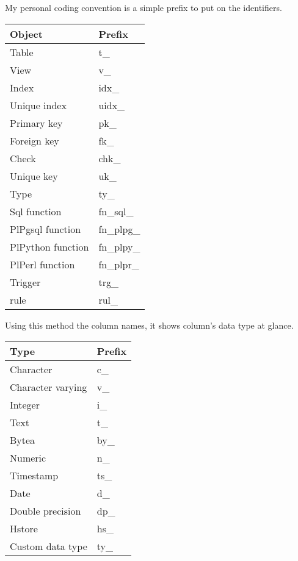 My personal coding convention is a simple prefix to put on the identifiers.
\begin{table}[H]
\begin{tabular}{ll}
 \textbf{Object} & \textbf{Prefix}  \\
 \hline
 Table & t\_ \\
 View & v\_ \\
Index & idx\_ \\
Unique index & uidx\_ \\
Primary key & pk\_ \\
Foreign key & fk\_ \\
Check & chk\_ \\
Unique key & uk\_ \\
Type & ty\_ \\
Sql function & fn\_sql\_ \\
PlPgsql function & fn\_plpg\_ \\
PlPython function & fn\_plpy\_ \\
PlPerl function & fn\_plpr\_ \\
Trigger & trg\_ \\
rule & rul\_ \\

\end{tabular}
\end{table}

Using this method the column names, it shows column's data type at glance.

\begin{table}[H]
\begin{tabular}{ll}
 \textbf{Type} & \textbf{Prefix}  \\
 \hline
 Character & c\_ \\
 Character varying & v\_ \\
Integer & i\_ \\
Text & t\_ \\
Bytea & by\_ \\
Numeric & n\_ \\
Timestamp & ts\_ \\
Date & d\_ \\
Double precision & dp\_ \\
Hstore & hs\_ \\
Custom data type & ty\_ \\

\end{tabular}
\end{table}




